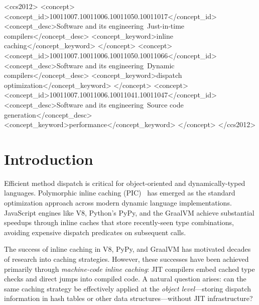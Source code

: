 \documentclass[sigplan,final]{acmart}
\begin{document}
\begin{CCSXML}
<ccs2012>
<concept>
<concept_id>10011007.10011006.10011050.10011017</concept_id>
<concept_desc>Software and its engineering~Just-in-time compilers</concept_desc>
<concept_keyword>inline caching</concept_keyword>
</concept>
<concept>
<concept_id>10011007.10011006.10011050.10011066</concept_id>
<concept_desc>Software and its engineering~Dynamic compilers</concept_desc>
<concept_keyword>dispatch optimization</concept_keyword>
</concept>
<concept>
<concept_id>10011007.10011006.10011041.10011047</concept_id>
<concept_desc>Software and its engineering~Source code generation</concept_desc>
<concept_keyword>performance</concept_keyword>
</concept>
</ccs2012>
\end{CCSXML}



\maketitle

\section{Introduction}

Efficient method dispatch is critical for object-oriented and dynamically-typed languages.
Polymorphic inline caching (PIC)~\cite{hoelzle1991optimizing} has emerged as the standard
optimization approach across modern dynamic language implementations. JavaScript engines like V8,
Python's PyPy, and the GraalVM achieve substantial speedups through inline caches that store
recently-seen type combinations, avoiding expensive dispatch predicates on subsequent calls.

The success of inline caching in V8, PyPy, and GraalVM has motivated decades of research into
caching strategies. However, these successes have been achieved primarily through \emph{machine-code
inline caching}: JIT compilers embed cached type checks and direct jumps into compiled code. A
natural question arises: can the same caching strategy be effectively applied at the \emph{object
level}—storing dispatch information in hash tables or other data structures—without JIT
infrastructure?
\end{document}
